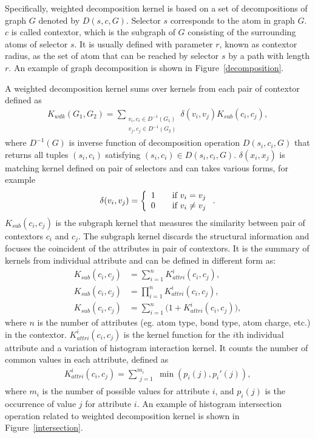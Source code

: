 \documentclass[english]{tktltiki}
\begin{document}
Specifically, weighted decomposition kernel is based on a set of decompositions of graph $G$ denoted by $D(s,c,G)$. Selector $s$ corresponds to the atom in graph $G$. $c$ is called contextor, which is the subgraph of $G$ consisting of the surrounding atoms of selector $s$. It is usually defined with parameter $r$, known as contextor radius, as the set of atom that can be reached by selector $s$ by a path with length $r$. An example of graph decomposition is shown in Figure~\ref{decomposition}. 

A weighted decomposition kernel sums over kernels from each pair of contextor defined as
\begin{align}
K_{wdk}(G_1,G_2) = 
\displaystyle\sum_{\substack{v_i,c_i \in D^{-1}(G_1)\\v_j,c_j \in D^{-1}(G_2)}}{\delta(v_i, v_j) K_{sub}(c_i,c_j)},
\label{wdk_definition}
\end{align}
where $D^{-1}(G)$ is inverse function of decomposition operation $D(s_i,c_i,G)$ that returns all tuples $(s_i,c_i)$ satisfying $(s_i,c_i) \in D(s_i,c_i,G)$. $\delta(x_i,x_j)$ is matching kernel defined on pair of selectors and can takes various forms, for example 
\begin{align*}
\delta{(v_i,v_j)} = 
\left\{ 
\begin{array}{l l}
1 & \quad \text{if } v_i = v_j\\
0 & \quad \text{if } v_i \ne v_j\\
\end{array} \right..
\end{align*}
$K_{sub}{(c_i,c_j)}$ is the subgraph kernel that measures the similarity between pair of contextors $c_i$ and $c_j$. The subgraph kernel discards the structural information and focuses the coincident of the attributes in pair of contextors. It is the summary of kernels from individual attribute and can be defined in different form as:
\begin{align*}
K_{sub}(c_i,c_j) &= \sum_{i=1}^{n}{K_{attri}^{i}{(c_i,c_j)}},\\
K_{sub}(c_i,c_j) &= \prod_{i=1}^{n}{K_{attri}^{i}{(c_i,c_j)}},\\
K_{sub}(c_i,c_j) &= \sum_{i=1}^{n}{(1+K_{attri}^{i}{(c_i,c_j))}},
\end{align*}
where $n$ is the number of attributes (eg. atom type, bond type, atom charge, etc.) in the contextor. $K^{i}_{attri}{(c_i,c_j)}$ is the kernel function for the $i$th individual attribute and a variation of histogram interaction kernel. It counts the number of common values in each attribute, defined as
\begin{align*}
K_{attri}^{i}(c_i,c_j) = \displaystyle\sum_{\substack{j = 1}}^{m_i}{\min(p_i(j), {p}_i'(j))},
\end{align*}
where $m_i$ is the number of possible values for attribute $i$, and $p_i(j)$ is the occurrence of value $j$ for attribute $i$. An example of histogram intersection operation related to weighted decomposition kernel is shown in Figure~\ref{intersection}.
\end{document}
